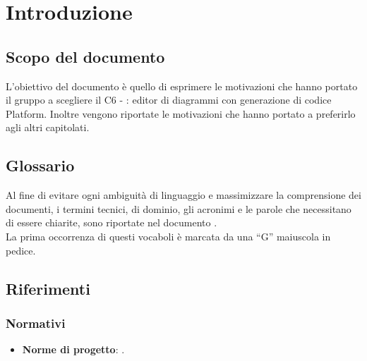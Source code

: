 \documentclass[../StudiodiFattibilita.tex]{subfiles}
\begin{document}
	\section{Introduzione}
		\subsection{Scopo del documento}
			L'obiettivo del documento è quello di esprimere le motivazioni che hanno portato il gruppo a scegliere il  C6 - \progetto: editor di diagrammi  con generazione di codice Platform.
			Inoltre vengono riportate le motivazioni che hanno portato a preferirlo agli altri capitolati.
		\subsection{Glossario}
			Al fine di evitare ogni ambiguità di linguaggio e massimizzare la
			comprensione dei documenti, i termini tecnici, di dominio, gli
			acronimi e le parole che necessitano di essere chiarite, sono
			riportate nel documento \glossariov.\\
			La prima occorrenza di questi vocaboli è
			marcata da una ``G'' maiuscola in pedice.
		\subsection{Riferimenti}
			\subsubsection{Normativi}
			\begin{itemize}
				\item \textbf{Norme di progetto}: \normediprogettov.
			\end{itemize}
\end{document}

